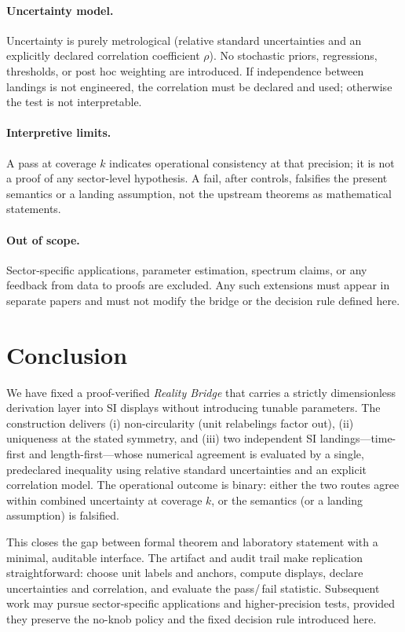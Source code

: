 \documentclass[11pt]{article}
\theoremstyle{plain}
\theoremstyle{definition}
\theoremstyle{remark}
\begin{document}
\paragraph{Uncertainty model.}
Uncertainty is purely metrological (relative standard uncertainties and an explicitly declared correlation coefficient \(\rho\)). No stochastic priors, regressions, thresholds, or post hoc weighting are introduced. If independence between landings is not engineered, the correlation must be declared and used; otherwise the test is not interpretable.

\paragraph{Interpretive limits.}
A pass at coverage \(k\) indicates operational consistency at that precision; it is not a proof of any sector-level hypothesis. A fail, after controls, falsifies the present semantics or a landing assumption, not the upstream theorems as mathematical statements.

\paragraph{Out of scope.}
Sector-specific applications, parameter estimation, spectrum claims, or any feedback from data to proofs are excluded. Any such extensions must appear in separate papers and must not modify the bridge or the decision rule defined here.

\section{Conclusion}

We have fixed a proof-verified \emph{Reality Bridge} that carries a strictly dimensionless derivation layer into SI displays without introducing tunable parameters. The construction delivers (i) non-circularity (unit relabelings factor out), (ii) uniqueness at the stated symmetry, and (iii) two independent SI landings—time-first and length-first—whose numerical agreement is evaluated by a single, pre\-declared inequality using relative standard uncertainties and an explicit correlation model. The operational outcome is binary: either the two routes agree within combined uncertainty at coverage \(k\), or the semantics (or a landing assumption) is falsified.

This closes the gap between formal theorem and laboratory statement with a minimal, auditable interface. The artifact and audit trail make replication straightforward: choose unit labels and anchors, compute displays, declare uncertainties and correlation, and evaluate the pass/\,fail statistic. Subsequent work may pursue sector-specific applications and higher-precision tests, provided they preserve the no-knob policy and the fixed decision rule introduced here.
\end{document}
